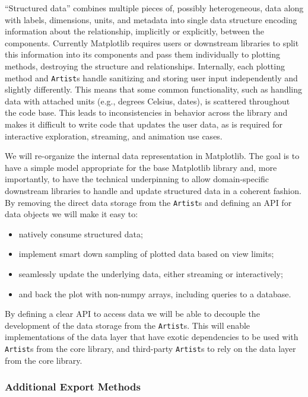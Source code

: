 \documentclass[11pt]{article}  %
\begin{document}
``Structured data'' combines multiple pieces of, possibly
heterogeneous, data along with labels, dimensions, units, and metadata into
single data structure encoding
 information about
the relationship, implicitly or explicitly, between the components.
Currently Matplotlib requires users or downstream libraries to split
this information into its components and pass them individually to
plotting methods, destroying the structure and relationships.
Internally, each plotting method and \texttt{Artist}s handle sanitizing and
storing user input independently and slightly differently.
This means that some common functionality, such as handling data with
attached units (e.g., degrees Celsius, dates), is scattered throughout the
code base.
This leads to inconsistencies in behavior across the library and makes
it difficult to write code that updates the user data, as is required
for interactive exploration, streaming, and animation use cases.


We will re-organize the internal data representation in Matplotlib.  The
goal is to have a simple model appropriate for the base Matplotlib
library and, more importantly, to have the technical underpinning to
allow domain-specific downstream libraries to handle and update
structured data in a coherent fashion.
By removing the direct data storage from the \texttt{Artist}s and
defining an API for data objects we will make it easy to:
\begin{itemize}[noitemsep]
  \item natively consume structured data;
  \item implement smart down sampling of plotted data based on view
    limits;
  \item seamlessly update the underlying data, either
    streaming or interactively;
  \item and back the plot with non-numpy arrays, including queries to
    a database.
\end{itemize}
By defining a clear API to access data we will be able to decouple
the development of the data storage from the \texttt{Artist}s.
This will enable implementations of the data layer that have exotic
dependencies to be used with \texttt{Artist}s from the core library,
and third-party \texttt{Artist}s to rely on the data layer from the
core library.



\subsubsection{Additional Export Methods}
\end{document}
